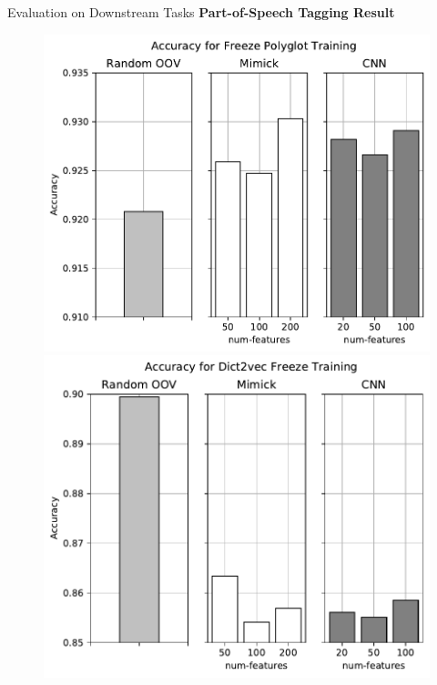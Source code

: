 \documentclass{beamer}
\begin{document}
\begin{frame}{Evaluation on Downstream Tasks}
    \textbf{Part-of-Speech Tagging Result}
    \begin{figure}[H]
        \centering
        \begin{minipage}{.48\textwidth}
            \includegraphics[width=\linewidth]{images/freeze_polyglot}
        \end{minipage}
        \begin{minipage}{.48\textwidth}
            \includegraphics[width=\linewidth]{images/freeze_dict2vec}
        \end{minipage}
    \end{figure}
\end{frame}
\end{document}
